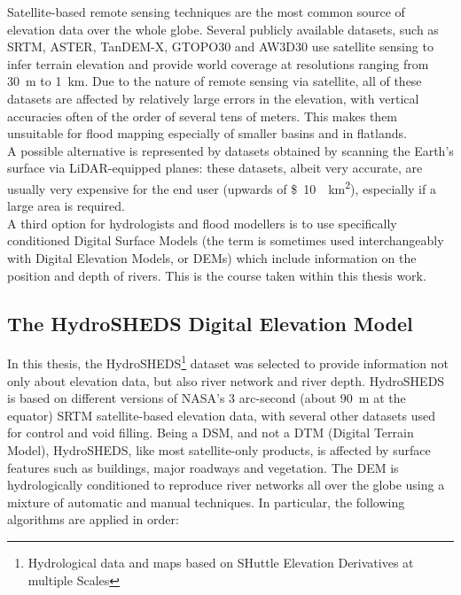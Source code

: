 Satellite-based remote sensing techniques are the most common source of elevation data over the whole globe. Several publicly available datasets, such as SRTM, ASTER, TanDEM-X, GTOPO30 and AW3D30 use satellite sensing to infer terrain elevation and provide world coverage at resolutions ranging from \SI{30}{\metre} to \SI{1}{\kilo\metre}. Due to the nature of remote sensing via satellite, all of these datasets are affected by relatively large errors in the elevation, with vertical accuracies often of the order of several tens of meters. This makes them unsuitable for flood mapping especially of smaller basins and in flatlands.\\
A possible alternative is represented by datasets obtained by scanning the Earth's surface via LiDAR-equipped planes: these datasets, albeit very accurate, are usually very expensive for the end user (upwards of \SI{10}[\$]{\per\km\squared}), especially if a large area is required.\\
A third option for hydrologists and flood modellers is to use specifically conditioned Digital Surface Models (the term is sometimes used interchangeably with Digital Elevation Models, or DEMs) which include information on the position and depth of rivers. This is the course taken within this thesis work.

\subsection{The HydroSHEDS Digital Elevation Model}
In this thesis, the HydroSHEDS\footnote{Hydrological data and maps based on SHuttle Elevation Derivatives at multiple Scales} dataset  \citep{Lehner2008, Lehner2013} was selected to provide information not only about elevation data, but also river network and river depth. HydroSHEDS is based on different versions of NASA's 3 arc-second (about \SI{90}{\metre} at the equator) SRTM satellite-based elevation data, with several other datasets used for control and void filling. Being a DSM, and not a DTM (Digital Terrain Model), HydroSHEDS, like most satellite-only products, is affected by surface features such as buildings, major roadways and vegetation.
The DEM is hydrologically conditioned to reproduce river networks all over the globe using a mixture of automatic and manual techniques. In particular, the following algorithms are applied in order:

